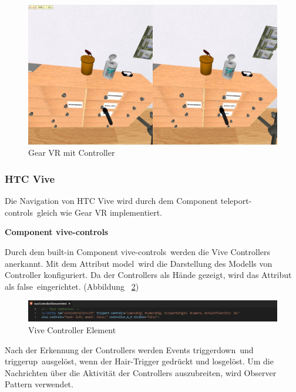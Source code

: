 \begin{figure}[ht]
\vspace*{0.3cm}
\centering
\includegraphics[width=\textwidth]{images/gearVRWithController.png}
\caption[Gear VR mit Controller]{Gear VR mit Controller}
\label{fig:GearVRWithController} 
\end{figure}
  
  \subsubsection{HTC Vive}
  
  Die Navigation von HTC Vive wird durch dem Component \glqq teleport-controls\grqq\ gleich wie Gear VR implementiert.
  
  \textbf{Component vive-controls}
  
  Durch dem built-in Component \glqq vive-controls\grqq\ werden die Vive Controllers anerkannt. Mit dem Attribut \glqq model\grqq\ wird die Darstellung des Modells von Controller konfiguriert. Da der Controllers als Hände gezeigt, wird das Attribut als \glqq false\grqq\ eingerichtet. (Abbildung ~\ref{fig:viveControllerElement})
  
\begin{figure}[ht]
\vspace*{0.3cm}
\centering
\includegraphics[width=\textwidth]{images/viveControllerElement.png}
\caption[Vive Controller Element]{Vive Controller Element}
\label{fig:viveControllerElement} 
\end{figure}
  
  Nach der Erkennung der Controllers werden Events \glqq triggerdown\grqq\ und \glqq triggerup\grqq\ ausgelöst, wenn der Hair-Trigger gedrückt und losgelöst. Um die Nachrichten über die Aktivität der Controllers auszubreiten, wird Observer Pattern verwendet.
  
